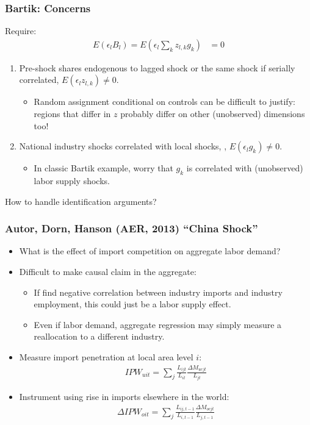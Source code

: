 \documentclass[english,xcolor=svgnames]{beamer}
\begin{document}
\begin{frame}
\frametitle[alignment=center]{Bartik: Concerns}
Require:
\begin{align*}
		E(\epsilon_l B_l) = E(\epsilon_l \sum_k z_{l,k}g_k) &= 0  
	\end{align*}
\begin{enumerate}
	\item Pre-shock shares endogenous to lagged shock or the same shock if serially correlated, $E(\epsilon_l  z_{l,k})\neq 0$.
	\begin{itemize}
		\item Random assignment conditional on controls can be difficult to justify: regions that differ in $z$ probably differ on other (unobserved) dimensions too!
	\end{itemize}
	\item National industry shocks correlated with local shocks,
, $E(\epsilon_l  g_k)\neq 0$. 
	\begin{itemize}
		\item In classic Bartik example, worry that $g_k$ is correlated with (unobserved) labor supply shocks.
	\end{itemize}
\end{enumerate}
How to handle identification arguments?
\end{frame}


\begin{frame}
\frametitle[alignment=center]{Autor, Dorn, Hanson (AER, 2013) ``China Shock''}
\begin{itemize}
	\item What is the effect of import competition on aggregate labor demand?
	\item Difficult to make causal claim in the aggregate:
	\begin{itemize}
		\item If find negative correlation between industry imports and industry employment, this could just be a labor supply effect.
		\item Even if labor demand, aggregate regression may  simply measure a reallocation to a different industry.
	\end{itemize}
	\item Measure import penetration at local area level $i$:
	\begin{align*}
		IPW_{uit} = \sum_j \frac{L_{ijt}}{L_{it}}  \frac{\Delta M_{ucjt}}{L_{jt}}
	\end{align*}
	\item Instrument using rise in imports elsewhere in the world:
	\begin{align*}
		\Delta IPW_{oit} = \sum_j \frac{L_{ij,t-1}}{L_{i,t-1}}  \frac{\Delta M_{ocjt}}{L_{j,t-1}}
	\end{align*}
\end{itemize}
\end{frame}
\end{document}
